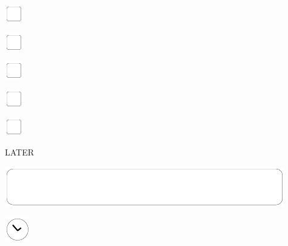 \documentclass[11pt,titlepage]{article}
\begin{document}
\vspace{10mm}

\noindent
\includegraphics[]{checkbox-4mm.pdf}

\vspace{10mm}

\noindent
\includegraphics[]{checkbox-4mm.pdf}

\vspace{10mm}

\noindent
\includegraphics[]{checkbox-4mm.pdf}

\vspace{10mm}

\noindent
\includegraphics[]{checkbox-4mm.pdf}

\vspace{10mm}

\noindent
\includegraphics[]{checkbox-4mm.pdf}

\pagebreak

\small %
\hfill LATER

\vspace{6mm}

\noindent
\includegraphics[]{mediumbox.pdf}

\vspace{15mm}

\noindent
\hspace{1mm}\includegraphics[]{clockface.pdf}

\vspace{10,5mm}
\end{document}

